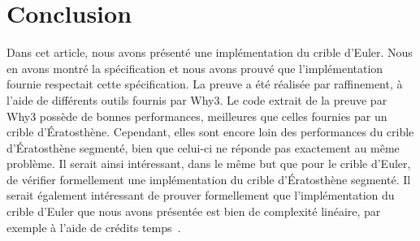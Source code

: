 \documentclass[a4paper]{easychair}
\begin{document}
\section{Conclusion}
\label{sec:conclusion}



Dans cet article, nous avons présenté une implémentation du crible d'Euler.
Nous en avons montré la spécification et nous avons prouvé que
l'implémentation fournie respectait cette spécification.
La preuve a été réalisée par raffinement, à l'aide de différents outils
fournis par Why3.
Le code extrait de la preuve par Why3 possède de bonnes performances,
meilleures que celles fournies par un crible d'Ératosthène.
Cependant, elles sont encore loin des performances du crible d'Ératosthène
segmenté, bien que celui-ci ne réponde pas exactement au même problème.
Il serait ainsi intéressant, dans le même but que pour le crible d'Euler,
de vérifier formellement une implémentation du crible d'Ératosthène
segmenté.
Il serait également intéressant de prouver formellement
que l'implémentation du crible
d'Euler que nous avons présentée est bien de complexité linéaire, par
exemple
à l'aide de crédits temps~\cite{chargueraud-pottier-uf-sltc-19}.





\end{document}
